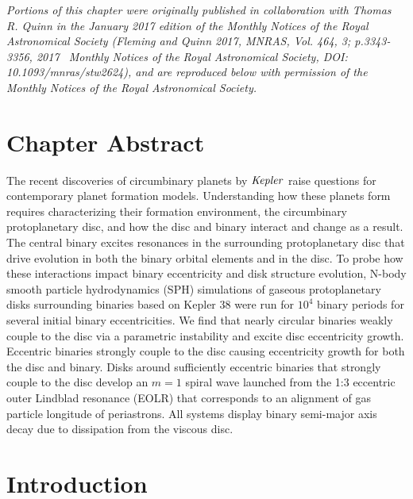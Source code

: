 \textit{Portions of this chapter were originally published in collaboration with Thomas R. Quinn in the January 2017 edition of the Monthly Notices of the Royal Astronomical Society (Fleming and Quinn 2017, MNRAS, Vol. 464, 3; p.3343-3356, 2017 \textcopyright \ Monthly Notices of the Royal Astronomical Society, DOI: 10.1093/mnras/stw2624), and are reproduced below with permission of the Monthly Notices of the Royal Astronomical Society.}

\section{Chapter Abstract}
The recent discoveries of circumbinary planets by $\it Kepler$ raise questions for contemporary planet formation
models.  Understanding how these planets form requires characterizing their formation environment, the circumbinary protoplanetary disc,
and how the disc and binary interact and change as a result.  The central binary excites resonances in the surrounding
protoplanetary disc that drive evolution in both the binary orbital elements and in the
disc.  To probe how these interactions impact binary eccentricity and disk structure evolution, N-body smooth particle
hydrodynamics (SPH) simulations of gaseous protoplanetary disks
surrounding binaries based on Kepler 38 were run for $10^4$ binary
periods for several initial binary eccentricities.  We find that
nearly circular binaries weakly couple to the disc via a parametric
instability and excite disc eccentricity growth.  Eccentric binaries strongly couple to the disc
causing eccentricity growth for both the disc and binary.
Disks around sufficiently eccentric binaries that strongly couple to the disc develop an
$m = 1$ spiral wave launched from the 1:3 eccentric outer Lindblad
resonance (EOLR) that corresponds to an alignment of gas
particle longitude of periastrons. All systems display binary semi-major axis decay due to dissipation from the
viscous disc. 

\section{Introduction}

